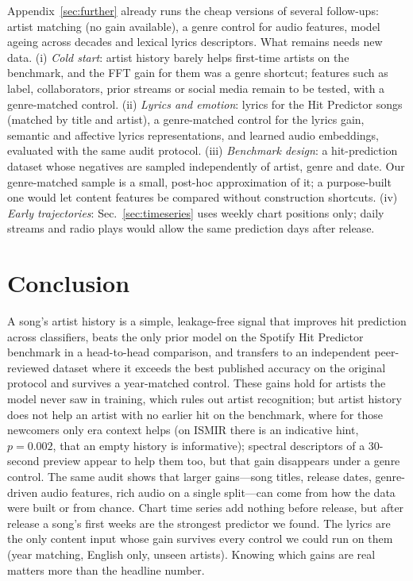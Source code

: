 \documentclass[conference]{IEEEtran}
\begin{document}
Appendix~\ref{sec:further} already runs the cheap versions of several follow-ups: artist
matching (no gain available), a genre control for audio features, model ageing across decades and
lexical lyrics descriptors. What remains needs new data.
(i) \emph{Cold start}: artist history barely helps first-time artists on the benchmark, and
the FFT gain for them was a genre shortcut; features such as label, collaborators, prior
streams or social media remain to be tested, with a genre-matched control.
(ii) \emph{Lyrics and emotion}: lyrics for the Hit Predictor songs (matched by title and
artist), a genre-matched control for the lyrics gain, semantic and affective lyrics representations, and learned
audio embeddings, evaluated with the same audit protocol.
(iii) \emph{Benchmark design}: a hit-prediction dataset whose negatives are sampled
independently of artist, genre and date. Our genre-matched sample is a small, post-hoc
approximation of it; a purpose-built one would let content features be compared without
construction shortcuts.
(iv) \emph{Early trajectories}: Sec.~\ref{sec:timeseries} uses weekly chart positions only;
daily streams and radio plays would allow the same prediction days after release.

\section{Conclusion}
A song's artist history is a simple, leakage-free signal that improves hit prediction
across classifiers, beats the only prior model on the Spotify Hit Predictor benchmark in a
head-to-head comparison, and transfers to an independent peer-reviewed dataset where it
exceeds the best published accuracy on the original protocol and survives a year-matched control. These gains hold
for artists the model never saw in training, which rules out artist recognition; but artist
history does not help an artist with no earlier hit on the benchmark, where for those newcomers only era context
helps (on ISMIR there is an indicative hint, $p=0.002$, that an empty history is informative); spectral descriptors of a 30-second
preview appear to help them too, but that gain disappears under a genre control. The same audit
shows that larger gains---song titles, release dates, genre-driven audio features, rich
audio on a single split---can
come from how the data were built or from chance. Chart time series add nothing before
release, but after release a song's first weeks are the strongest predictor we found. The lyrics are
the only content input whose gain survives every control we could run on them (year matching, English only,
unseen artists). Knowing which gains are real matters more
than the headline number.
\end{document}
